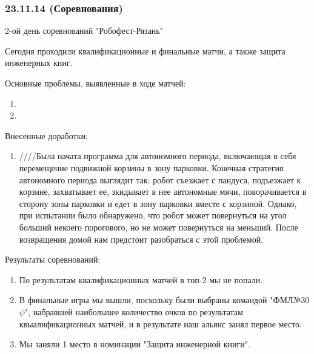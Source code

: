 \subsubsection{23.11.14 (Соревнования)}
\begin{center}
	2-ой день соревнований "Робофест-Рязань"
\end{center}
Сегодня проходили квалификационные и финальные матчи, а также защита инженерных книг.
\newline 

Основные проблемы, выявленные в ходе матчей:
\begin{enumerate}
	\item  
	
	\item 
	
\end{enumerate}

Внесенные доработки:
\begin{enumerate}
	\item ////Была начата программа для автономного периода, включающая в себя перемещение подвижной корзины в зону парковки. Конечная стратегия автономного периода выглядит так: робот съезжает с пандуса, подъезжает к корзине, захватывает ее, зкидывает в нее автономные мячи, поворачивается в сторону зоны парковки и едет в зону парковки вместе с корзиной. Однако, при испытании было обнаружено, что робот может повернуться на угол больший некоего порогового, но не может повернуться на меньший. После возвращения домой нам предстоит разобраться с этой проблемой.
\end{enumerate}

Результаты соревнований:
\begin{enumerate}
	\item По результатам квалификационных матчей в топ-2 мы не попали.
	
	\item В финальные игры мы вышли, поскольку были выбраны командой "ФМЛ№30 ${\psi}$", набравшей наибольшее количество очков по результатам квыалификационных матчей, и в результате наш альянс занял первое место.
	
	\item Мы заняли 1 место в номинации "Защита инженерной книги".
\end{enumerate}

